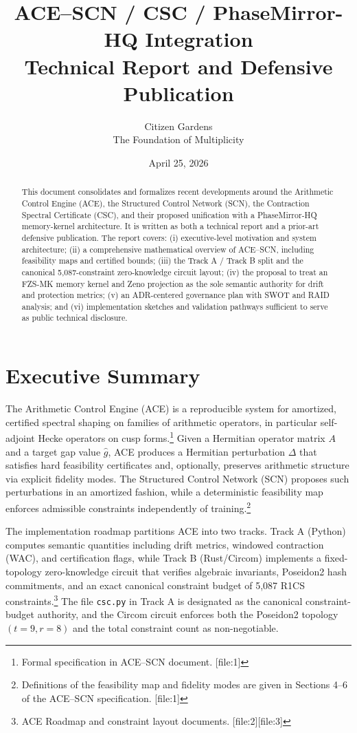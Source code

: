 \documentclass[11pt]{article}
\title{%
ACE--SCN / CSC / PhaseMirror-HQ Integration\\[4pt]
\large Technical Report and Defensive Publication
}
\author{Citizen Gardens \\ The Foundation of Multiplicity}
\date{April 25, 2026}
\begin{document}
\maketitle

\begin{abstract}
This document consolidates and formalizes recent developments around the Arithmetic Control Engine (ACE), the Structured Control Network (SCN), the Contraction Spectral Certificate (CSC), and their proposed unification with a PhaseMirror-HQ memory-kernel architecture. It is written as both a technical report and a prior-art defensive publication. The report covers: (i) executive-level motivation and system architecture; (ii) a comprehensive mathematical overview of ACE--SCN, including feasibility maps and certified bounds; (iii) the Track A / Track B split and the canonical 5{,}087-constraint zero-knowledge circuit layout; (iv) the proposal to treat an FZS-MK memory kernel and Zeno projection as the sole semantic authority for drift and protection metrics; (v) an ADR-centered governance plan with SWOT and RAID analysis; and (vi) implementation sketches and validation pathways sufficient to serve as public technical disclosure.%
\end{abstract}
\newpage
\tableofcontents
\newpage
\section{Executive Summary}

The Arithmetic Control Engine (ACE) is a reproducible system for amortized, certified spectral shaping on families of arithmetic operators, in particular self-adjoint Hecke operators on cusp forms.\footnote{Formal specification in ACE--SCN document. [file:1]} Given a Hermitian operator matrix \(A\) and a target gap value \(\hat g\), ACE produces a Hermitian perturbation \(\Delta\) that satisfies hard feasibility certificates and, optionally, preserves arithmetic structure via explicit fidelity modes. The Structured Control Network (SCN) proposes such perturbations in an amortized fashion, while a deterministic feasibility map enforces admissible constraints independently of training.\footnote{Definitions of the feasibility map and fidelity modes are given in Sections 4--6 of the ACE--SCN specification. [file:1]}

The implementation roadmap partitions ACE into two tracks. Track A (Python) computes semantic quantities including drift metrics, windowed contraction (WAC), and certification flags, while Track B (Rust/Circom) implements a fixed-topology zero-knowledge circuit that verifies algebraic invariants, Poseidon2 hash commitments, and an exact canonical constraint budget of 5{,}087 R1CS constraints.\footnote{ACE Roadmap and constraint layout documents. [file:2][file:3]} The file \texttt{csc.py} in Track A is designated as the canonical constraint-budget authority, and the Circom circuit enforces both the Poseidon2 topology \((t=9, r=8)\) and the total constraint count as non-negotiable.%
\end{document}
